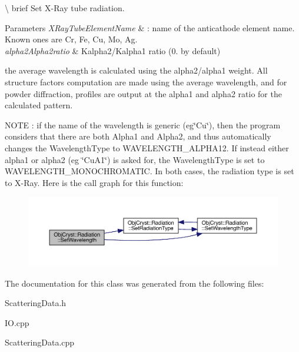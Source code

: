 \textbackslash{} brief Set X-\/\+Ray tube radiation.


\begin{DoxyParams}{Parameters}
{\em X\+Ray\+Tube\+Element\+Name} & \+: name of the anticathode element name. Known ones are Cr, Fe, Cu, Mo, Ag. \\
\hline
{\em alpha2\+Alpha2ratio} & Kalpha2/\+Kalpha1 ratio (0. by default)\\
\hline
\end{DoxyParams}
the average wavelength is calculated using the alpha2/alpha1 weight. All structure factors computation are made using the average wavelength, and for powder diffraction, profiles are output at the alpha1 and alpha2 ratio for the calculated pattern.

N\+O\+TE \+: if the name of the wavelength is generic (eg\char`\"{}\+Cu\char`\"{}), then the program considers that there are both Alpha1 and Alpha2, and thus automatically changes the Wavelength\+Type to W\+A\+V\+E\+L\+E\+N\+G\+T\+H\+\_\+\+A\+L\+P\+H\+A12. If instead either alpha1 or alpha2 (eg \char`\"{}\+Cu\+A1\char`\"{}) is asked for, the Wavelength\+Type is set to W\+A\+V\+E\+L\+E\+N\+G\+T\+H\+\_\+\+M\+O\+N\+O\+C\+H\+R\+O\+M\+A\+T\+IC. In both cases, the radiation type is set to X-\/\+Ray. Here is the call graph for this function\+:
\nopagebreak
\begin{figure}[H]
\begin{center}
\leavevmode
\includegraphics[width=350pt]{class_obj_cryst_1_1_radiation_a61393e596990f9fdac7dfc6d8acd91ac_cgraph}
\end{center}
\end{figure}


The documentation for this class was generated from the following files\+:\begin{DoxyCompactItemize}
\item 
Scattering\+Data.\+h\item 
I\+O.\+cpp\item 
Scattering\+Data.\+cpp\end{DoxyCompactItemize}
